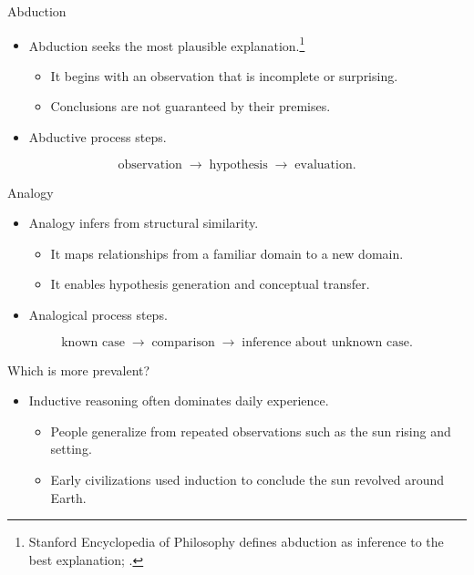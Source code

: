 \documentclass[12pt]{beamer}
\begin{document}
\begin{frame}{Abduction}
  \begin{itemize}
    \item Abduction seeks the most plausible explanation.\footnote{Stanford Encyclopedia of Philosophy defines abduction as inference to the best explanation; .}
      \begin{itemize}
        \item It begins with an observation that is incomplete or surprising.
        \item Conclusions are not guaranteed by their premises.
      \end{itemize}
    \item Abductive process steps.
  \end{itemize}
  \[
    \text{observation} \;\rightarrow\; \text{hypothesis} \;\rightarrow\; \text{evaluation}.
  \]
\end{frame}

\begin{frame}{Analogy}
  \begin{itemize}
    \item Analogy infers from structural similarity.
      \begin{itemize}
        \item It maps relationships from a familiar domain to a new domain.
        \item It enables hypothesis generation and conceptual transfer.
      \end{itemize}
    \item Analogical process steps.
  \end{itemize}
  \[
    \text{known case} \;\rightarrow\; \text{comparison} \;\rightarrow\; \text{inference about unknown case}.
  \]
\end{frame}

\begin{frame}{Which is more prevalent?}
  \begin{itemize}
    \item Inductive reasoning often dominates daily experience.
      \begin{itemize}
        \item People generalize from repeated observations such as the sun rising and setting.
        \item Early civilizations used induction to conclude the sun revolved around Earth.
      \end{itemize}
  \end{itemize}
\end{frame}
\end{document}
